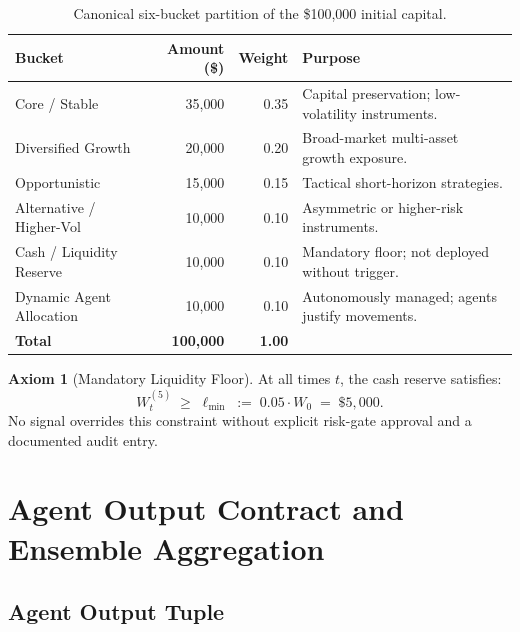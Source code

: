 \documentclass[12pt,openany]{book}
\numberwithin{equation}{chapter}
\theoremstyle{plain}
\theoremstyle{definition}
\newtheorem{axiom}[theorem]{Axiom}
\theoremstyle{remark}
\begin{document}
\begin{table}[H]
\centering
\caption{Canonical six-bucket partition of the \$100{,}000 initial capital.}
\label{tab:buckets}
\small
\begin{tabularx}{\linewidth}{@{} l r r X @{}}
\toprule
\textbf{Bucket} & \textbf{Amount (\$)} & \textbf{Weight}
  & \textbf{Purpose} \\
\midrule
Core / Stable               & 35{,}000 & 0.35
  & Capital preservation; low-volatility instruments. \\
Diversified Growth          & 20{,}000 & 0.20
  & Broad-market multi-asset growth exposure. \\
Opportunistic               & 15{,}000 & 0.15
  & Tactical short-horizon strategies. \\
Alternative / Higher-Vol    & 10{,}000 & 0.10
  & Asymmetric or higher-risk instruments. \\
Cash / Liquidity Reserve    & 10{,}000 & 0.10
  & Mandatory floor; not deployed without trigger. \\
Dynamic Agent Allocation    & 10{,}000 & 0.10
  & Autonomously managed; agents justify movements. \\
\midrule
\textbf{Total}              & \textbf{100{,}000} & \textbf{1.00} & \\
\bottomrule
\end{tabularx}
\end{table}

\begin{axiom}[Mandatory Liquidity Floor]
\label{ax:liquidity-floor}
At all times $t$, the cash reserve satisfies:
\begin{equation}
  W_t^{(5)} \;\geq\; \ell_{\min} \;:=\; 0.05 \cdot W_0 \;=\; \$5{,}000.
  \label{eq:liquidity-floor}
\end{equation}
No signal overrides this constraint without explicit risk-gate
approval and a documented audit entry.
\end{axiom}

\chapter{Agent Output Contract and Ensemble Aggregation}
\label{ch:agents}

\section{Agent Output Tuple}
\end{document}
